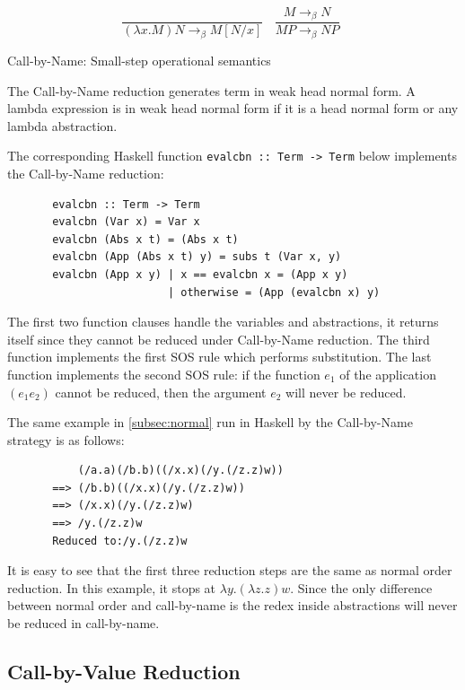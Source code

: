 \documentclass[a4paper,11pt,twoside]{report}
\begin{document}
\begin{equation*}
\frac{}{(\lambda x.M)N \rightarrow _\beta M[N/x]}\ \ \ \  
\frac{M \rightarrow _\beta N}{MP \rightarrow _\beta NP}\ \ 
\end{equation*}
\begin{center}
Call-by-Name: Small-step operational semantics
\end{center}

The Call-by-Name reduction generates term in weak head normal form. A lambda expression is in weak head normal form if it is a head normal form or any lambda abstraction. 


The corresponding Haskell function \verb|evalcbn :: Term -> Term| below implements the Call-by-Name reduction:

\begin{verbatim}
       evalcbn :: Term -> Term
       evalcbn (Var x) = Var x
       evalcbn (Abs x t) = (Abs x t)
       evalcbn (App (Abs x t) y) = subs t (Var x, y)
       evalcbn (App x y) | x == evalcbn x = (App x y)
	                     | otherwise = (App (evalcbn x) y) 
\end{verbatim}


The first two function clauses handle the variables and abstractions, it returns itself since they cannot be reduced under Call-by-Name reduction. The third function implements the first SOS rule which performs substitution. The last function implements the second SOS rule: if the function $e_1$ of the application $(e_1e_2)$ cannot be reduced, then the argument $e_2$ will never be reduced. 

The same example in \ref{subsec:normal} run in Haskell by the Call-by-Name strategy is as follows:

\begin{verbatim}
           (/a.a)(/b.b)((/x.x)(/y.(/z.z)w))
       ==> (/b.b)((/x.x)(/y.(/z.z)w))
       ==> (/x.x)(/y.(/z.z)w)
       ==> /y.(/z.z)w
       Reduced to:/y.(/z.z)w
\end{verbatim}

It is easy to see that the first three reduction steps are the same as normal order reduction. In this example, it stops at $\lambda y.(\lambda z.z)w$. Since the only difference between normal order and call-by-name is the redex inside abstractions will never be reduced in call-by-name. 


\subsection{Call-by-Value Reduction}{\label{subsec:cbv}}
\end{document}
